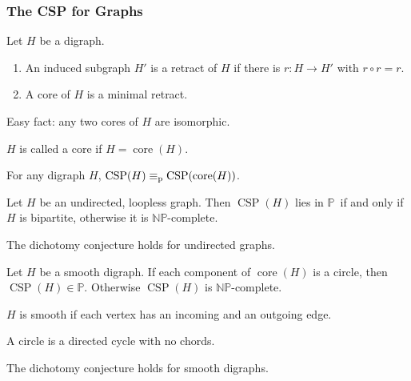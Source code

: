 \documentclass[12pt,xcolor=dvipsnames,handout
   ]{beamer}
\DeclareMathOperator{\CSP}{CSP}
\renewcommand{\.}{\cdot}
\DeclareMathOperator{\core}{core}
\newcommand{\equivp}{\equiv_{\text{\textnormal{p}}}}
\newcommand{\NP}{\ensuremath{\mathbb{NP}}\xspace}
\renewcommand{\P}{\ensuremath{\mathbb{P}}\xspace}
\let\emph=\alert
\begin{document}

\begin{frame}
  \frametitle{The CSP for Graphs}

  \begin{definition}
    Let $H$ be a digraph.
    \begin{enumerate}
    \item An induced subgraph $H'$ is a \emph{retract} of $H$ if there
      is $r\colon H \to H'$ with $r\circ r = r$.
    \item A \emph{core} of $H$ is a minimal retract.
    \end{enumerate}
  \end{definition}

  \pause
  Easy fact: any two cores of $H$ are isomorphic. 

  $H$ is called a \emph{core} if $H=\core(H)$. 
\end{frame}

\begin{frame}
  \begin{lemma}
    For any digraph $H$, $\CSP(H)\equivp \CSP(\core(H))$.
  \end{lemma}

  \pause

  \begin{theorem}
    Let $H$ be an undirected, loopless graph. Then $\CSP(H)$ lies in
    \P\ if and only if $H$ is bipartite, otherwise it is \NP-complete. 
  \end{theorem}

  \pause
  
  \begin{corollary}
    The dichotomy conjecture holds for undirected graphs.
  \end{corollary}
\end{frame}

\begin{frame}
  \begin{theorem}
    Let $H$ be a smooth digraph. If each component of $\core(H)$ is a
    circle, then $\CSP(H)\in \P$. Otherwise $\CSP(H)$ is \NP-complete.    
  \end{theorem}

  \pause
  $H$ is \emph{smooth} if each vertex has an incoming and an outgoing
  edge. 

  A \emph{circle} is a directed cycle with no chords.

  \begin{corollary}
    The dichotomy conjecture holds for smooth digraphs.
  \end{corollary}
\end{frame}
\end{document}
